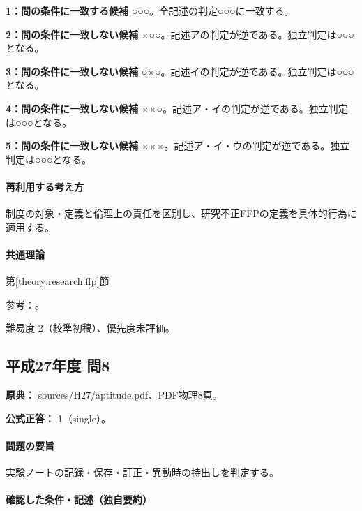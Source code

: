 \noindent\textbf{1：問の条件に一致する候補} ○○○。全記述の判定○○○に一致する。\par

\noindent\textbf{2：問の条件に一致しない候補} ×○○。記述アの判定が逆である。独立判定は○○○となる。\par

\noindent\textbf{3：問の条件に一致しない候補} ○×○。記述イの判定が逆である。独立判定は○○○となる。\par

\noindent\textbf{4：問の条件に一致しない候補} ××○。記述ア・イの判定が逆である。独立判定は○○○となる。\par

\noindent\textbf{5：問の条件に一致しない候補} ×××。記述ア・イ・ウの判定が逆である。独立判定は○○○となる。\par

\paragraph{再利用する考え方} 制度の対象・定義と倫理上の責任を区別し、研究不正FFPの定義を具体的行為に適用する。

\paragraph{共通理論} \hyperref[theory:research:ffp]{第\ref*{theory:research:ffp}節}

\par 参考：\cite{mext_misconduct2014}。

\par 難易度 2（校準初稿）、優先度未評価。

\subsection{平成27年度 問8}
\label{q:h27-reg-apt-08}

\noindent\textbf{原典：} sources/H27/aptitude.pdf、PDF物理8頁。

\textbf{公式正答：} 1（single）。

\paragraph{問題の要旨} 実験ノートの記録・保存・訂正・異動時の持出しを判定する。

\paragraph{確認した条件・記述（独自要約）}\mbox{}\par

